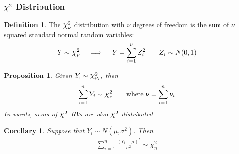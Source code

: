 \documentclass[12pt]{article}
\theoremstyle{plain}
\newtheorem{prop}[thm]{Proposition}
\newtheorem{cor}[thm]{Corollary}
\theoremstyle{definition}
\newtheorem{defn}[thm]{Definition}
\theoremstyle{remark}
\newcommand*{\Chi}{\mbox{\large$\chi$}} %
\begin{document}
\clearpage
\subsubsection{$\Chi^2$ Distribution}


\begin{defn}
The $\Chi^2_\nu$ distribution with $\nu$ degrees of freedom is the sum of
$\nu$ squared standard normal random variables:
\begin{align*}
  Y \sim \Chi^2_\nu
  \quad\implies\quad
	 Y = \sum^\nu_{i=1} Z^2_i
   \qquad Z_i \sim N(0,1)
\end{align*}
\end{defn}

\begin{prop}
\label{prop:chisum}
Given $Y_i \sim \Chi_{\nu_i}^2$, then
\begin{align*}
  \sum^n_{i=1} Y_i \sim \Chi^2_{\nu}
  \qquad
  \text{where}\;
  \nu=\sum^n_{i=1} \nu_i
\end{align*}
In words, sums of $\Chi^2$ RVs are also $\Chi^2$ distributed.
\end{prop}

\begin{cor}
\label{cor:chimu}
Suppose that $Y_i \sim N(\mu,\sigma^2)$. Then
\begin{align*}
  \sum^n_{i=1} \frac{(Y_i-\mu)^2}{\sigma^2}  \sim \chi^2_n
\end{align*}
\end{cor}
\end{document}
